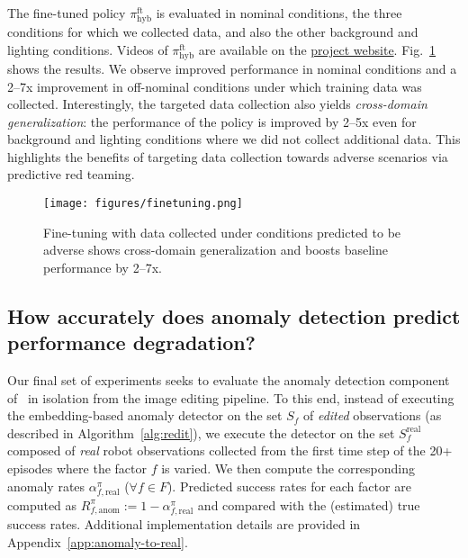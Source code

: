 The fine-tuned policy $\pi_\text{hyb}^\text{ft}$ is evaluated in nominal conditions, the three conditions for which we collected data, and also the other background and lighting conditions. Videos of $\pi_\text{hyb}^\text{ft}$ are available on the \href{https://predictive-red-team.github.io/}{project website}. Fig.~\ref{fig:finetuning} shows the results. We observe improved performance in nominal conditions and a 2--7x improvement in off-nominal conditions under which training data was collected. Interestingly, the targeted data collection also yields \emph{cross-domain generalization}: the performance of the policy is improved by 2--5x even for background and lighting conditions where we did not collect additional data. This highlights the benefits of targeting data collection towards adverse scenarios via predictive red teaming. 

\begin{figure}[h]
    \centering
    \texttt{[image: figures/finetuning.png]}
    \caption{Fine-tuning with data collected under conditions predicted to be adverse shows cross-domain generalization and boosts baseline performance by 2--7x.}
    \label{fig:finetuning}
\vspace{-10pt}
\end{figure}

\subsection{How accurately does anomaly detection predict performance degradation?} 
\label{sec:anomaly-to-real}

Our final set of experiments seeks to evaluate the anomaly detection component of \redit~in isolation from the image editing pipeline. To this end, instead of executing the embedding-based anomaly detector on the set $S_f$ of \emph{edited} observations (as described in Algorithm~\ref{alg:redit}), we execute the detector on the set $S_f^\text{real}$ composed of \emph{real} robot observations collected from the first time step of the 20+ episodes where the factor $f$ is varied. We then compute the corresponding anomaly rates $\alpha_{f, \text{real}}^\pi$ ($\forall f \in F$). Predicted success rates for each factor are computed as  $R_{f, \text{anom}}^\pi := 1 - \alpha_{f, \text{real}}^\pi$ and compared with the (estimated) true success rates. Additional implementation details are provided in Appendix~\ref{app:anomaly-to-real}.

